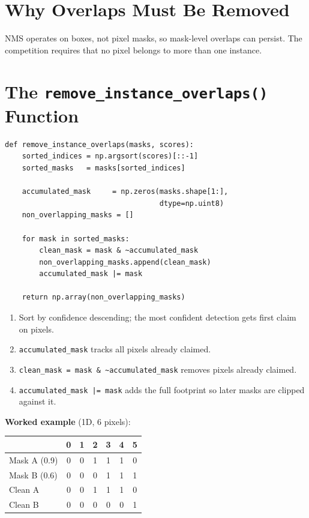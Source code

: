\documentclass[11pt,a4paper,openany]{report}
\begin{document}
\section{Why Overlaps Must Be Removed}

NMS operates on boxes, not pixel masks, so mask-level overlaps can persist. The competition
requires that no pixel belongs to more than one instance.

\section{The \texttt{remove\_instance\_overlaps()} Function}

\begin{lstlisting}[caption={Confidence-priority overlap elimination},label={lst:overlap}]
def remove_instance_overlaps(masks, scores):
    sorted_indices = np.argsort(scores)[::-1]
    sorted_masks   = masks[sorted_indices]

    accumulated_mask     = np.zeros(masks.shape[1:],
                                    dtype=np.uint8)
    non_overlapping_masks = []

    for mask in sorted_masks:
        clean_mask = mask & ~accumulated_mask
        non_overlapping_masks.append(clean_mask)
        accumulated_mask |= mask

    return np.array(non_overlapping_masks)
\end{lstlisting}

\begin{enumerate}
  \item Sort by confidence descending; the most confident detection gets first claim on pixels.
  \item \texttt{accumulated\_mask} tracks all pixels already claimed.
  \item \texttt{clean\_mask = mask \& \textasciitilde accumulated\_mask} removes pixels already claimed.
  \item \texttt{accumulated\_mask |= mask} adds the full footprint so later masks are clipped against it.
\end{enumerate}

\textbf{Worked example} (1D, 6 pixels):

\begin{center}
\renewcommand{\arraystretch}{1.3}
\begin{tabular}{lcccccc}
\toprule
& 0 & 1 & 2 & 3 & 4 & 5 \\
\midrule
Mask A (0.9) & 0 & 0 & 1 & 1 & 1 & 0 \\
Mask B (0.6) & 0 & 0 & 0 & 1 & 1 & 1 \\
Clean A      & 0 & 0 & 1 & 1 & 1 & 0 \\
Clean B      & 0 & 0 & 0 & 0 & 0 & 1 \\
\bottomrule
\end{tabular}
\end{center}
\end{document}

